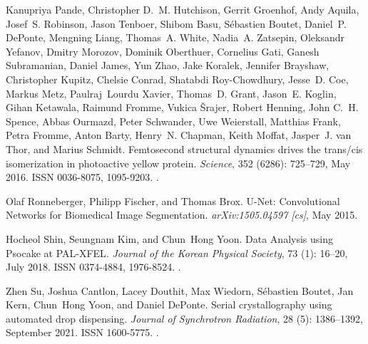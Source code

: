 \documentclass[a4paper]{article}
\begin{document}
\begin{thebibliography}{33}
Kanupriya Pande, Christopher D.~M. Hutchison, Gerrit Groenhof, Andy Aquila,
  Josef~S. Robinson, Jason Tenboer, Shibom Basu, S{\'e}bastien Boutet,
  Daniel~P. DePonte, Mengning Liang, Thomas~A. White, Nadia~A. Zatsepin,
  Oleksandr Yefanov, Dmitry Morozov, Dominik Oberthuer, Cornelius Gati, Ganesh
  Subramanian, Daniel James, Yun Zhao, Jake Koralek, Jennifer Brayshaw,
  Christopher Kupitz, Chelsie Conrad, Shatabdi {Roy-Chowdhury}, Jesse~D. Coe,
  Markus Metz, Paulraj~Lourdu Xavier, Thomas~D. Grant, Jason~E. Koglin, Gihan
  Ketawala, Raimund Fromme, Vukica {\v S}rajer, Robert Henning, John C.~H.
  Spence, Abbas Ourmazd, Peter Schwander, Uwe Weierstall, Matthias Frank, Petra
  Fromme, Anton Barty, Henry~N. Chapman, Keith Moffat, Jasper~J. {van Thor},
  and Marius Schmidt.
\newblock Femtosecond structural dynamics drives the trans/cis isomerization in
  photoactive yellow protein.
\newblock \emph{Science}, 352 (6286): 725--729, May 2016.
\newblock ISSN 0036-8075, 1095-9203.
\newblock {}.

Olaf Ronneberger, Philipp Fischer, and Thomas Brox.
\newblock U-{{Net}}: {{Convolutional Networks}} for {{Biomedical Image
  Segmentation}}.
\newblock \emph{arXiv:1505.04597 [cs]}, May 2015.

Hocheol Shin, Seungnam Kim, and Chun~Hong Yoon.
\newblock Data {{Analysis}} using {{Psocake}} at {{PAL-XFEL}}.
\newblock \emph{Journal of the Korean Physical Society}, 73
  (1): 16--20, July 2018.
\newblock ISSN 0374-4884, 1976-8524.
\newblock {}.

Zhen Su, Joshua Cantlon, Lacey Douthit, Max Wiedorn, S{\'e}bastien Boutet, Jan
  Kern, Chun~Hong Yoon, and Daniel DePonte.
\newblock Serial crystallography using automated drop dispensing.
\newblock \emph{Journal of Synchrotron Radiation}, 28 (5):
  1386--1392, September 2021.
\newblock ISSN 1600-5775.
\newblock {}.


\end{thebibliography}
\end{document}
